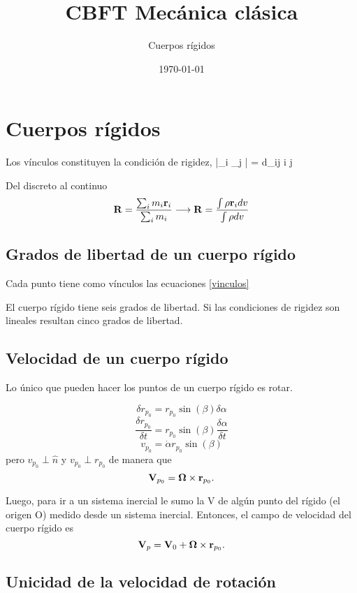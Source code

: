 \documentclass[10pt,oneside]{CBFT_article}
\title{CBFT Mecánica clásica}
\author{Cuerpos rígidos}
\date{\today}
\begin{document}
\maketitle
\tableofcontents


\section{Cuerpos rígidos}

Los vínculos constituyen la condición de rigidez,
\be
	|_i _j | = d_{ij}	\qquad i \neq j
\label{vinculos}
\ee

Del discreto al continuo
\[
	\vb{R} = \frac{\sum_i m_i\vb{r}_i}{\sum_i m_i} \longrightarrow 
	\vb{R} = \frac{\int \rho \vb{r}_i dv }{\int \rho dv} 
\]

\subsection{Grados de libertad de un cuerpo rígido}

Cada punto tiene como vínculos las ecuaciones \eqref{vinculos}

El cuerpo rígido tiene seis grados de libertad.
Si las condiciones de rigidez son lineales resultan cinco grados de libertad.

\subsection{Velocidad de un cuerpo rígido}

Lo único que pueden hacer los puntos de un cuerpo rígido es rotar.

\[
	\delta r_{p_0} = r_{p_0} \sin(\beta) \delta \alpha
\]
\[
	\frac{\delta r_{p_0}}{\delta t} = r_{p_0} \sin(\beta) \frac{\delta\alpha}{\delta t}
\]
\[
	v_{p_0} = \dot{\alpha} r_{p_0} \sin(\beta)
\]
pero $v_{p_0} \perp \hat{n}$ y $v_{p_0} \perp r_{p_0}$ de manera que 
\[
	\vb{V}_{p_0} = \vb{\Omega} \times \vb{r}_{p_0}.
\]

Luego, para ir a un sistema inercial le sumo la V de algún punto del rígido (el origen O)
medido desde un sistema inercial. Entonces, el campo de velocidad del cuerpo rígido es
\[
	\vb{V}_{p} = \vb{V}_0 + \vb{\Omega} \times \vb{r}_{p_0}.
\]

\subsection{Unicidad de la velocidad de rotación}
\end{document}
